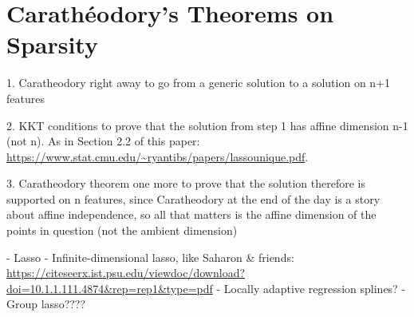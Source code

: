 \chapter{Carath\'{e}odory's Theorems on Sparsity}
\label{chap:charactheodory_sparsity}

1. Caratheodory right away to go from a generic solution to a solution on n+1 
features 

2. KKT conditions to prove that the solution from step 1 has affine dimension
n-1 (not n). As in Section 2.2 of this paper:
\url{https://www.stat.cmu.edu/~ryantibs/papers/lassounique.pdf}.  

3. Caratheodory theorem one more to prove that the solution therefore is
supported on n features, since Caratheodory at the end of the day is a story
about affine independence, so all that matters is the affine dimension of the
points in question (not the ambient dimension) 

- Lasso
- Infinite-dimensional lasso, like Saharon \& friends: \url{https://citeseerx.ist.psu.edu/viewdoc/download?doi=10.1.1.111.4874&rep=rep1&type=pdf}
- Locally adaptive regression splines?
- Group lasso???? 

